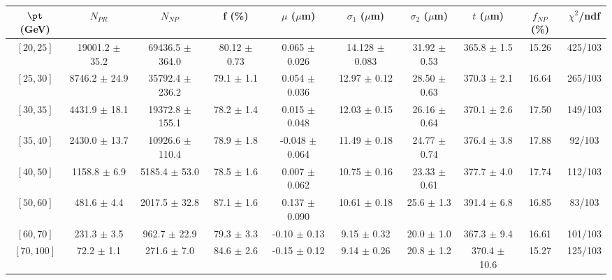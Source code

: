 \begin{tabular}{c||c|c|c|c|c|c|c||c|c}
$\pt$ (GeV) & $N_{PR}$ & $N_{NP}$ & f (\%) & $\mu$ ($\mu$m) & $\sigma_1$ ($\mu$m) & $\sigma_2$ ($\mu$m)  & $t$ ($\mu$m) & $f_{NP}$ (\%) & $\chi^2$/ndf \\
\hline
$[20, 25]$ & 19001.2 $\pm$ 35.2 & 69436.5 $\pm$ 364.0 & 80.12 $\pm$ 0.73 & 0.065 $\pm$ 0.026 & 14.128 $\pm$ 0.083 & 31.92 $\pm$ 0.53 & 365.8 $\pm$ 1.5 & 15.26 & 425/103\\
$[25, 30]$ & 8746.2 $\pm$ 24.9 & 35792.4 $\pm$ 236.2 & 79.1 $\pm$ 1.1 & 0.054 $\pm$ 0.036 & 12.97 $\pm$ 0.12 & 28.50 $\pm$ 0.63 & 370.3 $\pm$ 2.1 & 16.64 & 265/103\\
$[30, 35]$ & 4431.9 $\pm$ 18.1 & 19372.8 $\pm$ 155.1 & 78.2 $\pm$ 1.4 & 0.015 $\pm$ 0.048 & 12.03 $\pm$ 0.15 & 26.16 $\pm$ 0.64 & 370.1 $\pm$ 2.6 & 17.50 & 149/103\\
$[35, 40]$ & 2430.0 $\pm$ 13.7 & 10926.6 $\pm$ 110.4 & 78.9 $\pm$ 1.8 & -0.048 $\pm$ 0.064 & 11.49 $\pm$ 0.18 & 24.77 $\pm$ 0.74 & 376.4 $\pm$ 3.8 & 17.88 & 92/103\\
$[40, 50]$ & 1158.8 $\pm$ 6.9 & 5185.4 $\pm$ 53.0 & 78.5 $\pm$ 1.6 & 0.007 $\pm$ 0.062 & 10.75 $\pm$ 0.16 & 23.33 $\pm$ 0.61 & 377.7 $\pm$ 4.0 & 17.74 & 112/103\\
$[50, 60]$ & 481.6 $\pm$ 4.4 & 2017.5 $\pm$ 32.8 & 87.1 $\pm$ 1.6 & 0.137 $\pm$ 0.090 & 10.61 $\pm$ 0.18 & 25.6 $\pm$ 1.3 & 391.4 $\pm$ 6.8 & 16.85 & 83/103\\
$[60, 70]$ & 231.3 $\pm$ 3.5 & 962.7 $\pm$ 22.9 & 79.3 $\pm$ 3.3 & -0.10 $\pm$ 0.13 & 9.15 $\pm$ 0.32 & 20.0 $\pm$ 1.0 & 367.3 $\pm$ 9.4 & 16.61 & 101/103\\
$[70, 100]$ & 72.2 $\pm$ 1.1 & 271.6 $\pm$ 7.0 & 84.6 $\pm$ 2.6 & -0.15 $\pm$ 0.12 & 9.14 $\pm$ 0.26 & 20.8 $\pm$ 1.2 & 370.4 $\pm$ 10.6 & 15.27 & 125/103\\
\end{tabular}
